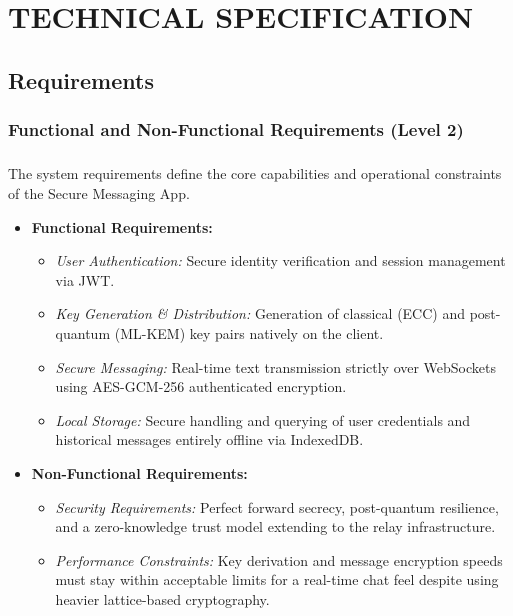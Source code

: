 \chapter{\MakeUppercase{Technical Specification}}


\section{Requirements}
\subsection{Functional and Non-Functional Requirements (Level 2)}
\paragraph{}
The system requirements define the core capabilities and operational constraints of the Secure Messaging App. 
\begin{itemize}
	\item \textbf{Functional Requirements:} 
	\begin{itemize}
		\item \textit{User Authentication:} Secure identity verification and session management via JWT.
		\item \textit{Key Generation \& Distribution:} Generation of classical (ECC) and post-quantum (ML-KEM) key pairs natively on the client.
		\item \textit{Secure Messaging:} Real-time text transmission strictly over WebSockets using AES-GCM-256 authenticated encryption.
		\item \textit{Local Storage:} Secure handling and querying of user credentials and historical messages entirely offline via IndexedDB.
	\end{itemize}
	\item \textbf{Non-Functional Requirements:}
	\begin{itemize}
		\item \textit{Security Requirements:} Perfect forward secrecy, post-quantum resilience, and a zero-knowledge trust model extending to the relay infrastructure.
		\item \textit{Performance Constraints:} Key derivation and message encryption speeds must stay within acceptable limits for a real-time chat feel despite using heavier lattice-based cryptography.
	\end{itemize}
\end{itemize}

